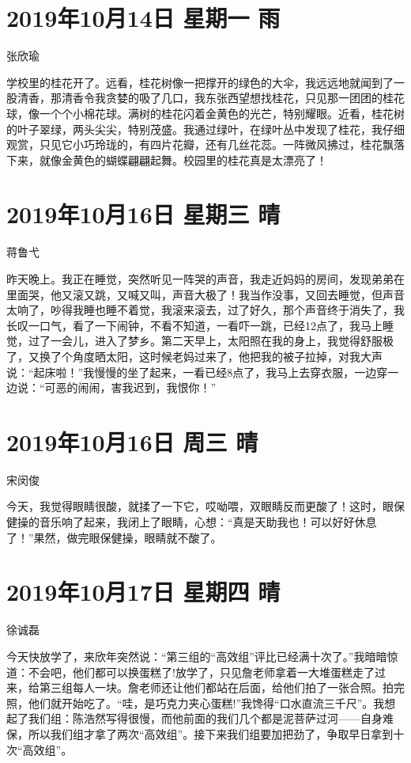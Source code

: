 \section{2019年10月14日 星期一 雨}

张欣瑜

学校里的桂花开了。远看，桂花树像一把撑开的绿色的大伞，我远远地就闻到了一股清香，那清香令我贪婪的吸了几口，我东张西望想找桂花，只见那一团团的桂花球，像一个个小棉花球。满树的桂花闪着金黄色的光芒，特别耀眼。近看，桂花树的叶子翠绿，两头尖尖，特别茂盛。我通过绿叶，在绿叶丛中发现了桂花，我仔细观赏，只见它小巧玲珑的，有四片花瓣，还有几丝花蕊。一阵微风拂过，桂花飘落下来，就像金黄色的蝴蝶翩翩起舞。校园里的桂花真是太漂亮了！

\section{2019年10月16日 星期三 晴}

蒋鲁弋

昨天晚上。我正在睡觉，突然听见一阵哭的声音，我走近妈妈的房间，发现弟弟在里面哭，他又滚又跳，又喊又叫，声音大极了！我当作没事，又回去睡觉，但声音太响了，吵得我睡也睡不着觉，我滚来滚去，过了好久，那个声音终于消失了，我长叹一口气，看了一下闹钟，不看不知道，一看吓一跳，已经12点了，我马上睡觉，过了一会儿，进入了梦乡。第二天早上，太阳照在我的身上，我觉得舒服极了，又换了个角度晒太阳，这时候老妈过来了，他把我的被子拉掉，对我大声说：``起床啦！''我慢慢的坐了起来，一看已经8点了，我马上去穿衣服，一边穿一边说：``可恶的闹闹，害我迟到，我恨你！''

\section{2019年10月16日 周三 晴}

宋闵俊

今天，我觉得眼睛很酸，就揉了一下它，哎呦喂，双眼睛反而更酸了！这时，眼保健操的音乐响了起来，我闭上了眼睛，心想：``真是天助我也！可以好好休息了！''果然，做完眼保健操，眼睛就不酸了。

\section{2019年10月17日 星期四 晴}

徐诚磊

今天快放学了，来欣年突然说：``第三组的``高效组''评比已经满十次了。''我暗暗惊道：不会吧，他们都可以换蛋糕了!放学了，只见詹老师拿着一大堆蛋糕走了过来，给第三组每人一块。詹老师还让他们都站在后面，给他们拍了一张合照。拍完照，他们就开始吃了。``哇，是巧克力夹心蛋糕!''我馋得``口水直流三千尺''。我想起了我们组：陈浩然写得很慢，而他前面的我们几个都是泥菩萨过河------自身难保，所以我们组才拿了两次``高效组''。接下来我们组要加把劲了，争取早日拿到十次``高效组''。

